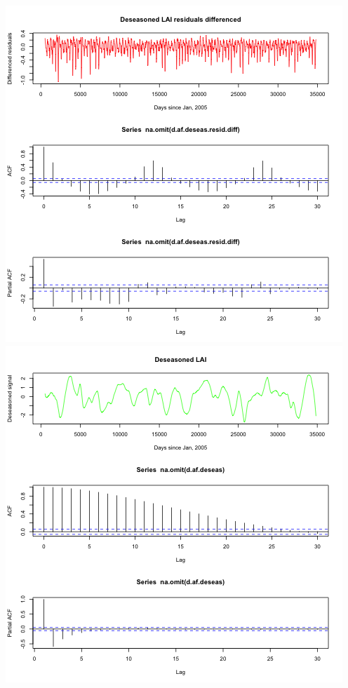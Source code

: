 \documentclass[11pt]{article}
\begin{document}
\includegraphics{../img/deseasonalization_resid_difference.png}
\includegraphics{../img/deseasonalization.png}
\end{document}
